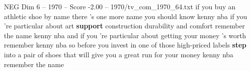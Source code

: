 \begin{textsample}{NEG Dim 6 – 1970 – Score -2.00 – 1970/tv\_com\_1970\_64.txt}  \label{ex:f6_neg_062}
if you buy an athletic shoe by name there 's one more name you should know kenny nba if you 're particular about art \textbf{support} construction durability and comfort remember the name kenny nba and if you 're particular about getting your money 's worth remember kenny nba so before you invest in one of those high-priced labels \textbf{step} into a pair of shoes that will give you a great run for your money kenny nba remember the name

\end{textsample}

